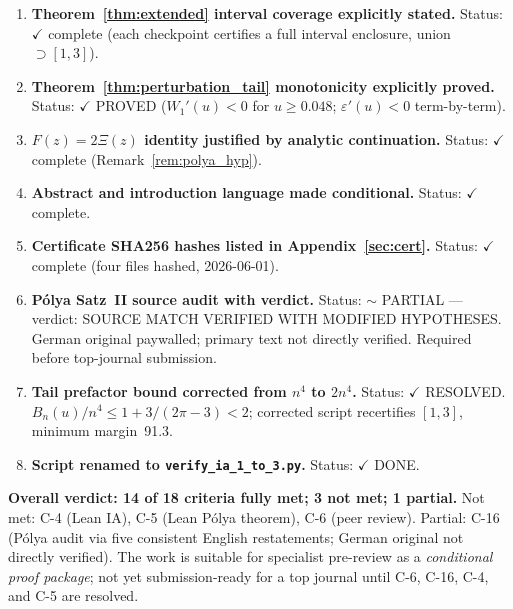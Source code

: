 \documentclass[11pt]{article}
\theoremstyle{definition}
\theoremstyle{remark}
\begin{document}
\begin{enumerate}
\item[C-11.] \textbf{Theorem~\ref{thm:extended} interval coverage explicitly stated.}
  Status: $\checkmark$ complete (each checkpoint certifies a full interval enclosure, union $\supset [1,3]$).

\item[C-12.] \textbf{Theorem~\ref{thm:perturbation_tail} monotonicity explicitly proved.}
  Status: $\checkmark$ PROVED ($W_1'(u)<0$ for $u\geq 0.048$; $\varepsilon'(u)<0$ term-by-term).

\item[C-13.] \textbf{$F(z)=2\Xi(z)$ identity justified by analytic continuation.}
  Status: $\checkmark$ complete (Remark~\ref{rem:polya_hyp}).

\item[C-14.] \textbf{Abstract and introduction language made conditional.}
  Status: $\checkmark$ complete.

\item[C-15.] \textbf{Certificate SHA256 hashes listed in Appendix~\ref{sec:cert}.}
  Status: $\checkmark$ complete (four files hashed, 2026-06-01).

\item[C-16.] \textbf{P\'olya Satz~II source audit with verdict.}
  Status: $\sim$ PARTIAL --- verdict: SOURCE MATCH VERIFIED WITH MODIFIED HYPOTHESES.
  German original paywalled; primary text not directly verified.
  Required before top-journal submission.

\item[C-17.] \textbf{Tail prefactor bound corrected from $n^4$ to $2n^4$.}
  Status: $\checkmark$ RESOLVED. $B_n(u)/n^4 \leq 1+3/(2\pi-3) < 2$;
  corrected script recertifies $[1,3]$, minimum margin~91.3.

\item[C-18.] \textbf{Script renamed to \texttt{verify\_ia\_1\_to\_3.py}.}
  Status: $\checkmark$ DONE.
\end{enumerate}

\noindent \textbf{Overall verdict: 14 of 18 criteria fully met; 3 not met; 1 partial.}
Not met: C-4 (Lean IA), C-5 (Lean P\'olya theorem), C-6 (peer review).
Partial: C-16 (P\'olya audit via five consistent English restatements; German original not directly verified).
The work is suitable for specialist pre-review as a \emph{conditional proof package};
not yet submission-ready for a top journal until C-6, C-16, C-4, and C-5 are resolved.
\end{document}
